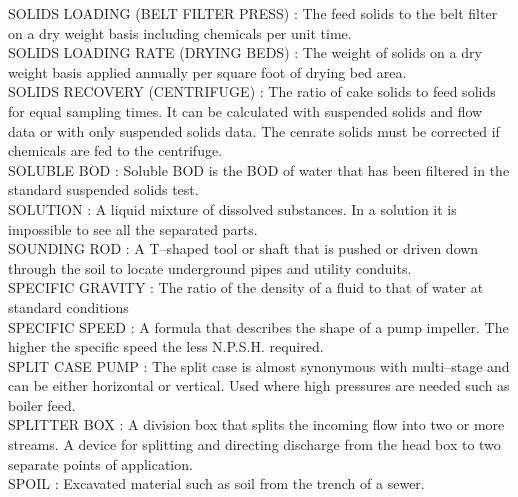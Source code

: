 \vspace{0.15cm}
SOLIDS LOADING (BELT FILTER PRESS) :  The feed solids to the belt filter on a dry weight basis including chemicals per unit time. \\
\vspace{0.15cm}
SOLIDS LOADING RATE (DRYING BEDS) :  The weight of solids on a dry weight basis applied annually per square foot of drying bed area. \\
\vspace{0.15cm}
SOLIDS RECOVERY (CENTRIFUGE) :  The ratio of cake solids to feed solids for equal sampling times. It can be calculated with suspended solids and flow data or with only suspended solids data. The cenrate solids must be corrected if chemicals are fed to the centrifuge. \\
\vspace{0.15cm}
SOLUBLE BOD :  Soluble BOD is the BOD of water that has been filtered in the standard suspended solids test.\\
\vspace{0.15cm}
SOLUTION :  A liquid mixture of dissolved substances. In a solution it is impossible to see all the separated parts.\\
\vspace{0.15cm}
SOUNDING ROD :  A T–shaped tool or shaft that is pushed or driven down through the soil to locate underground pipes and utility conduits. \\
\vspace{0.15cm}
SPECIFIC GRAVITY :   The ratio of the density of a fluid to that of water at standard conditions\\
\vspace{0.15cm}
SPECIFIC SPEED :   A formula that describes the shape of a pump impeller. The higher the specific speed the less N.P.S.H. required.\\
\vspace{0.15cm}
SPLIT CASE PUMP :   The split case is almost synonymous with multi–stage and can be either horizontal or vertical. Used where high pressures are needed such as boiler feed.\\
\vspace{0.15cm}
SPLITTER BOX :   A division box that splits the incoming flow into two or more streams. A device for splitting and directing discharge from the head box to two separate points of application.\\
\vspace{0.15cm}
SPOIL :  Excavated material such as soil from the trench of a sewer. \\
